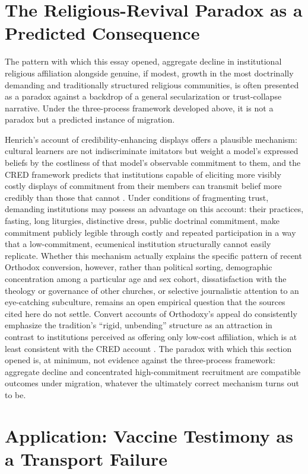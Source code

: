 \documentclass[11pt]{article}
\begin{document}
\section{The Religious-Revival Paradox as a Predicted Consequence}

The pattern with which this essay opened, aggregate decline in institutional religious affiliation alongside genuine, if modest, growth in the most doctrinally demanding and traditionally structured religious communities, is often presented as a paradox against a backdrop of a general secularization or trust-collapse narrative. Under the three-process framework developed above, it is not a paradox but a predicted instance of migration.

Henrich's account of credibility-enhancing displays offers a plausible mechanism: cultural learners are not indiscriminate imitators but weight a model's expressed beliefs by the costliness of that model's observable commitment to them, and the CRED framework predicts that institutions capable of eliciting more visibly costly displays of commitment from their members can transmit belief more credibly than those that cannot \citep{henrich2009}. Under conditions of fragmenting trust, demanding institutions may possess an advantage on this account: their practices, fasting, long liturgies, distinctive dress, public doctrinal commitment, make commitment publicly legible through costly and repeated participation in a way that a low-commitment, ecumenical institution structurally cannot easily replicate. Whether this mechanism actually explains the specific pattern of recent Orthodox conversion, however, rather than political sorting, demographic concentration among a particular age and sex cohort, dissatisfaction with the theology or governance of other churches, or selective journalistic attention to an eye-catching subculture, remains an open empirical question that the sources cited here do not settle. Convert accounts of Orthodoxy's appeal do consistently emphasize the tradition's ``rigid, unbending'' structure as an attraction in contrast to institutions perceived as offering only low-cost affiliation, which is at least consistent with the CRED account \citep{nyt2025orthodox}. The paradox with which this section opened is, at minimum, not evidence against the three-process framework: aggregate decline and concentrated high-commitment recruitment are compatible outcomes under migration, whatever the ultimately correct mechanism turns out to be.

\section{Application: Vaccine Testimony as a Transport Failure}
\end{document}
